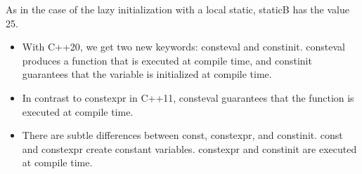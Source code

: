As in the case of the lazy initialization with a local static, staticB has the value 25.

\begin{tcolorbox}[colback=blue!5!white,colframe=blue!75!black,title={Distilled Information}]
\begin{itemize}
\item 
With C++20, we get two new keywords: consteval and constinit. consteval produces a function that is executed at compile time, and constinit guarantees that the variable is initialized at compile time.

\item 
In contrast to constexpr in C++11, consteval guarantees that the function is executed at compile time.

\item 
There are subtle differences between const, constexpr, and constinit. const and constexpr create constant variables. constexpr and constinit are executed at compile time.
\end{itemize}
\end{tcolorbox}	





